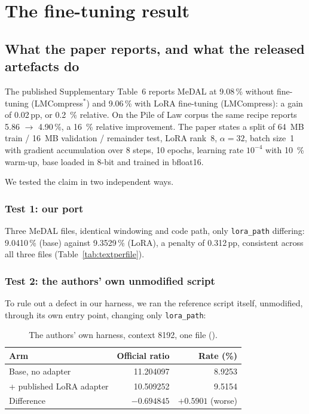 \documentclass[11pt,a4paper]{article}
\newcommand{\code}[1]{\texttt{\small #1}}
\newcommand{\file}[1]{\texttt{\footnotesize\detokenize{#1}}}
\begin{document}
\section{The fine-tuning result}
\label{ch:finetune}

\subsection{What the paper reports, and what the released artefacts do}

The published Supplementary Table~6 reports MeDAL at \num{9.08}\,\% without
fine-tuning (LMCompress$^{*}$) and \num{9.06}\,\% with LoRA fine-tuning
(LMCompress): a gain of \num{0.02}\,pp, or \SI{0.2}{\%} relative. On the Pile
of Law corpus the same recipe reports \num{5.86} $\to$ \num{4.90}\,\%, a
\SI{16}{\%} relative improvement. The paper states a split of
\SI{64}{MB} train / \SI{16}{MB} validation / remainder test, LoRA rank~8,
$\alpha = 32$, batch size~1 with gradient accumulation over 8 steps, 10 epochs,
learning rate $10^{-4}$ with \SI{10}{\%} warm-up, base loaded in 8-bit and
trained in bfloat16.

We tested the claim in two independent ways.

\subsubsection{Test 1: our port}

Three MeDAL files, identical windowing and code path, only \code{lora\_path}
differing: \num{9.0410}\,\% (base) against \num{9.3529}\,\% (LoRA), a penalty of
\num{+0.312}\,pp, consistent across all three files
(Table~\ref{tab:textperfile}).

\subsubsection{Test 2: the authors' own unmodified script}

To rule out a defect in our harness, we ran the reference script itself,
unmodified, through its own entry point, changing only \code{lora\_path}:

\begin{table}[htbp]
\centering
\small
\caption{The authors' own harness, context \num{8192}, one file
(\file{medal\_102285.csv}).}
\label{tab:loraref}
\begin{tabular}{lrr}
\toprule
Arm & Official ratio & Rate (\%) \\
\midrule
Base, no adapter & 11.204097 & 8.9253 \\
+ published LoRA adapter & 10.509252 & 9.5154 \\
\midrule
Difference & $-0.694845$ & $\mathbf{+0.5901}$ (worse) \\
\bottomrule
\end{tabular}
\end{table}
\end{document}
